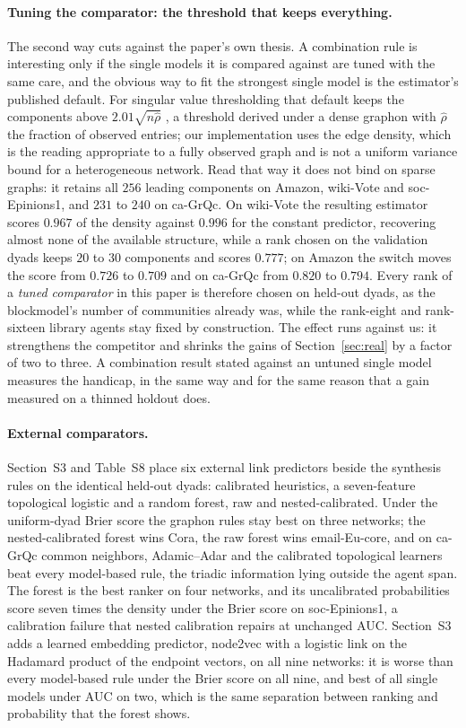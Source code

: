 \documentclass[12pt]{article}
\begin{document}
\paragraph{Tuning the comparator: the threshold that keeps everything.} The second way cuts against the paper's own thesis. A combination rule is interesting only if the single models it is compared against are tuned with the same care, and the obvious way to fit the strongest single model is the estimator's published default. For singular value thresholding that default keeps the components above $2.01\sqrt{n\hat\rho}$ \citep{Chatterjee2015}, a threshold derived under a dense graphon with $\hat\rho$ the fraction of observed entries; our implementation uses the edge density, which is the reading appropriate to a fully observed graph and is not a uniform variance bound for a heterogeneous network. Read that way it does not bind on sparse graphs: it retains all $256$ leading components on Amazon, wiki-Vote and soc-Epinions1, and $231$ to $240$ on ca-GrQc. On wiki-Vote the resulting estimator scores $0.967$ of the density against $0.996$ for the constant predictor, recovering almost none of the available structure, while a rank chosen on the validation dyads keeps $20$ to $30$ components and scores $0.777$; on Amazon the switch moves the score from $0.726$ to $0.709$ and on ca-GrQc from $0.820$ to $0.794$. Every rank of a \emph{tuned comparator} in this paper is therefore chosen on held-out dyads, as the blockmodel's number of communities already was, while the rank-eight and rank-sixteen library agents stay fixed by construction. The effect runs against us: it strengthens the competitor and shrinks the gains of Section~\ref{sec:real} by a factor of two to three. A combination result stated against an untuned single model measures the handicap, in the same way and for the same reason that a gain measured on a thinned holdout does.

\paragraph{External comparators.}
Section~S3 and Table~S8 place six external link predictors beside the synthesis rules on the identical held-out dyads: calibrated heuristics, a seven-feature topological logistic and a random forest, raw and nested-calibrated. Under the uniform-dyad Brier score the graphon rules stay best on three networks; the nested-calibrated forest wins Cora, the raw forest wins email-Eu-core, and on ca-GrQc common neighbors, Adamic--Adar and the calibrated topological learners beat every model-based rule, the triadic information lying outside the agent span. The forest is the best ranker on four networks, and its uncalibrated probabilities score seven times the density under the Brier score on soc-Epinions1, a calibration failure that nested calibration repairs at unchanged AUC. Section~S3 adds a learned embedding predictor, node2vec with a logistic link on the Hadamard product of the endpoint vectors, on all nine networks: it is worse than every model-based rule under the Brier score on all nine, and best of all single models under AUC on two, which is the same separation between ranking and probability that the forest shows.
\end{document}

